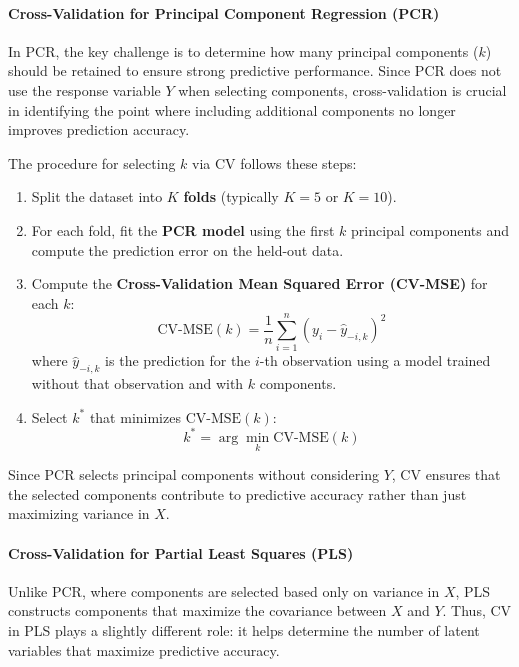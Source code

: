\documentclass[11pt,twoside,a4paper]{article}
\begin{document}
\paragraph{Cross-Validation for Principal Component Regression (PCR)}
In PCR, the key challenge is to determine how many principal components (\( k \)) should be retained to ensure strong predictive performance. Since PCR does not use the response variable \( Y \) when selecting components, cross-validation is crucial in identifying the point where including additional components no longer improves prediction accuracy.

The procedure for selecting \( k \) via CV follows these steps:
\begin{enumerate}
    \item Split the dataset into \( K \) \textbf{folds} (typically \( K = 5 \) or \( K = 10 \)).
    \item For each fold, fit the \textbf{PCR model} using the first \( k \) principal components and compute the prediction error on the held-out data.
    \item Compute the \textbf{Cross-Validation Mean Squared Error (CV-MSE)} for each \( k \):
    \begin{equation}
    \text{CV-MSE}(k) = \frac{1}{n} \sum_{i=1}^{n} (y_i - \hat{y}_{-i,k})^2
    \end{equation}
    where \( \hat{y}_{-i,k} \) is the prediction for the \( i \)-th observation using a model trained without that observation and with \( k \) components.
    \item Select \( k^* \) that minimizes \(\text{CV-MSE}(k)\):
    \begin{equation}
    k^* = \arg\min_k \text{CV-MSE}(k)
    \end{equation}
\end{enumerate}

Since PCR selects principal components without considering \( Y \), CV ensures that the selected components contribute to predictive accuracy rather than just maximizing variance in \( X \).

\paragraph{Cross-Validation for Partial Least Squares (PLS)}
Unlike PCR, where components are selected based only on variance in \( X \), PLS constructs components that maximize the covariance between \( X \) and \( Y \). Thus, CV in PLS plays a slightly different role: it helps determine the number of latent variables that maximize predictive accuracy.
\end{document}
